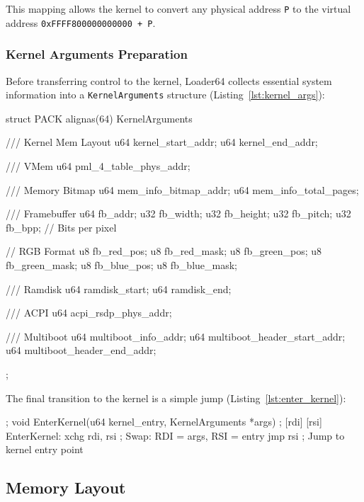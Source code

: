 \documentclass[a4paper,10pt,twoside]{report}
\theoremstyle{definition}
\begin{document}
This mapping allows the kernel to convert any physical address \texttt{P} to the virtual address \texttt{0xFFFF800000000000 + P}.

\clearpage

\subsubsection{Kernel Arguments Preparation}

Before transferring control to the kernel, Loader64 collects essential system information into a \texttt{KernelArguments} structure (Listing~\ref{lst:kernel_args}):

\begin{cppcode}[caption={Kernel Arguments Preparation (main.cpp)}, label={lst:kernel_args}]
struct PACK alignas(64) KernelArguments {
    /// Kernel Mem Layout
    u64 kernel_start_addr;
    u64 kernel_end_addr;

    /// VMem
    u64 pml_4_table_phys_addr;

    /// Memory Bitmap
    u64 mem_info_bitmap_addr;
    u64 mem_info_total_pages;

    /// Framebuffer
    u64 fb_addr;
    u32 fb_width;
    u32 fb_height;
    u32 fb_pitch;
    u32 fb_bpp;  // Bits per pixel

    // RGB Format
    u8 fb_red_pos;
    u8 fb_red_mask;
    u8 fb_green_pos;
    u8 fb_green_mask;
    u8 fb_blue_pos;
    u8 fb_blue_mask;

    /// Ramdisk
    u64 ramdisk_start;
    u64 ramdisk_end;

    /// ACPI
    u64 acpi_rsdp_phys_addr;

    /// Multiboot
    u64 multiboot_info_addr;
    u64 multiboot_header_start_addr;
    u64 multiboot_header_end_addr;
};
\end{cppcode}

\clearpage

The final transition to the kernel is a simple jump (Listing~\ref{lst:enter_kernel}):

\begin{nasmcode}[caption={Kernel Entry (transition.nasm)}, label={lst:enter_kernel}]
; void EnterKernel(u64 kernel_entry, KernelArguments *args)
;                  [rdi]            [rsi]
EnterKernel:
    xchg rdi, rsi       ; Swap: RDI = args, RSI = entry
    jmp rsi             ; Jump to kernel entry point
\end{nasmcode}

\subsection{Memory Layout}
\end{document}
